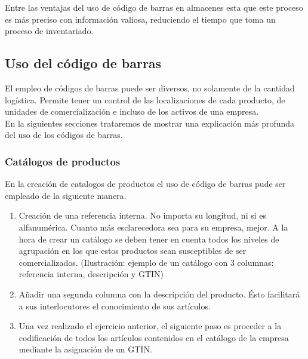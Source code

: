 Entre las ventajas del uso de código de barras en almacenes esta que este proceso es más preciso con información valiosa, reduciendo el tiempo que toma un proceso de inventariado.

\subsection{Uso del código de barras}

El empleo de códigos de barras puede ser diversos, no solamente de la cantidad logística. Permite tener un control de las localizaciones de cada producto, de unidades de comercialización e incluso de los activos de una empresa.\\ [\citep{CCCB:2019:Online}]

En la siguientes secciones trataremos de mostrar una explicación más profunda del uso de los códigos de barras.\\

\subsubsection{Catálogos de productos}
En la creación de catalogos de productos el uso de código de barras pude ser empleado de la siguiente manera. \citep{CCCB:2019:Online}

\begin{enumerate}

\item Creación de una referencia interna. No importa su longitud, ni si es alfanumérica. Cuanto más esclarecedora sea para su empresa, mejor. A la hora de crear un catálogo se deben tener en cuenta todos los niveles de agrupación en los que estos productos sean susceptibles de ser comercializados. (Ilustración: ejemplo de un catálogo con 3 columnas: referencia interna, descripción y GTIN)

\item Añadir una segunda columna con la descripción del producto. Ésto facilitará a sus interlocutores el conocimiento de sus artículos.

\item Una vez realizado el ejercicio anterior, el siguiente paso es proceder a la codificación de todos los artículos contenidos en el catálogo de la empresa mediante la asignación de un GTIN.
\end{enumerate}

